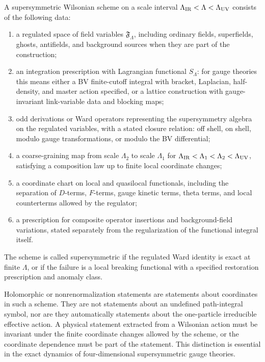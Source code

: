 \begin{definition}
\label{def:supersymmetric-wilsonian-scheme}
A supersymmetric Wilsonian scheme on a scale interval
\(\Lambda_{\rm IR}<\Lambda<\Lambda_{\rm UV}\) consists of the following data:
\begin{enumerate}[label=(\roman*)]
\item a regulated space of field variables \(\mathfrak F_\Lambda\), including
ordinary fields, superfields, ghosts, antifields, and background sources when
they are part of the construction;
\item an integration prescription with Lagrangian functional \(S_\Lambda\):
for gauge theories this means either a BV finite-cutoff integral with
bracket, Laplacian, half-density, and master action specified, or a lattice
construction with gauge-invariant link-variable data and blocking maps;
\item odd derivations or Ward operators representing the supersymmetry
algebra on the regulated variables, with a stated closure relation: off shell,
on shell, modulo gauge transformations, or modulo the BV differential;
\item a coarse-graining map from scale \(\Lambda_2\) to scale \(\Lambda_1\)
for \(\Lambda_{\rm IR}<\Lambda_1<\Lambda_2<\Lambda_{\rm UV}\), satisfying a
composition law up to finite local coordinate changes;
\item a coordinate chart on local and quasilocal functionals, including the
separation of \(D\)-terms, \(F\)-terms, gauge kinetic terms, theta terms,
and local counterterms allowed by the regulator;
\item a prescription for composite operator insertions and background-field
variations, stated separately from the regularization of the functional
integral itself.
\end{enumerate}
The scheme is called supersymmetric if the regulated Ward identity is exact
at finite \(\Lambda\), or if the failure is a local breaking functional with a
specified restoration prescription and anomaly class.
\end{definition}

Holomorphic or nonrenormalization statements are statements about coordinates
in such a scheme.  They are not statements about an undefined path-integral
symbol, nor are they automatically statements about the one-particle
irreducible effective action.  A physical statement extracted from a
Wilsonian action must be invariant under the finite coordinate changes allowed
by the scheme, or the coordinate dependence must be part of the statement.
This distinction is essential in the exact dynamics of four-dimensional
supersymmetric gauge theories.

